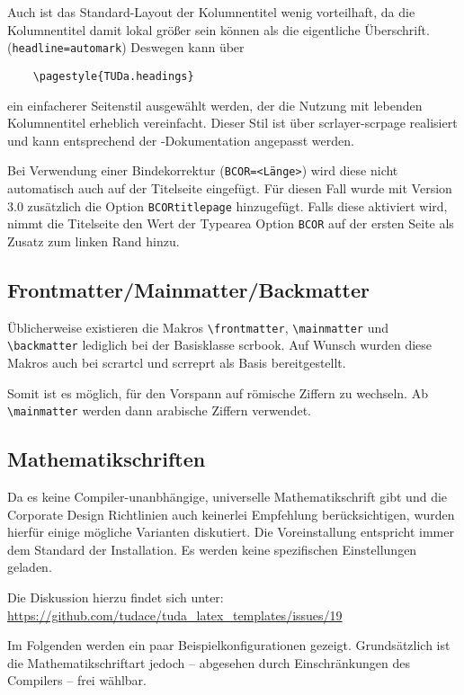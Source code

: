 \documentclass[
	ngerman,
	accentcolor=9c,%
	]{tudapub}
\let\code\texttt
\let\pck\textsf
\let\cls\textsf
\begin{document}
Auch ist das Standard-Layout der Kolumnentitel wenig vorteilhaft, da die Kolumnentitel damit lokal größer sein können als die eigentliche Überschrift. (\code{headline=automark})
Deswegen kann über
\begin{verbatim}
	\pagestyle{TUDa.headings}
\end{verbatim}
ein einfacherer Seitenstil ausgewählt werden, der die Nutzung mit lebenden Kolumnentitel erheblich vereinfacht. Dieser Stil ist über \pck{scrlayer-scrpage} realisiert und kann entsprechend der \KOMAScript{}-Dokumentation angepasst werden.

Bei Verwendung einer Bindekorrektur (\code{BCOR=<Länge>}) wird diese nicht automatisch auch auf der Titelseite eingefügt. Für diesen Fall wurde mit Version 3.0 zusätzlich die Option \code{BCORtitlepage} hinzugefügt. Falls diese aktiviert wird, nimmt die Titelseite den Wert der Typearea Option \code{BCOR} auf der ersten Seite als Zusatz zum linken Rand hinzu.


\subsection{Frontmatter/Mainmatter/Backmatter}
Üblicherweise existieren die Makros \verb+\frontmatter+, \verb+\mainmatter+ und \verb+\backmatter+ lediglich bei der Basisklasse \cls{scrbook}.
Auf Wunsch wurden diese Makros auch bei \cls{scrartcl} und \cls{scrreprt} als Basis bereitgestellt.

Somit ist es möglich, für den Vorspann auf römische Ziffern zu wechseln. Ab \verb+\mainmatter+ werden dann arabische Ziffern verwendet.


\subsection{Mathematikschriften}
Da es keine Compiler-unanbhängige, universelle Mathematikschrift gibt und die Corporate Design Richtlinien auch keinerlei Empfehlung berücksichtigen, wurden hierfür einige mögliche Varianten diskutiert. Die Voreinstallung entspricht immer dem Standard der Installation. Es werden keine spezifischen Einstellungen geladen.

Die Diskussion hierzu findet sich unter:\\
\url{https://github.com/tudace/tuda_latex_templates/issues/19}

Im Folgenden werden ein paar Beispielkonfigurationen gezeigt. Grundsätzlich ist die Mathematikschriftart jedoch -- abgesehen durch Einschränkungen des Compilers -- frei wählbar.
\end{document}
